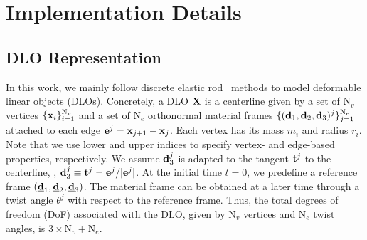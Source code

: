 \section{Implementation Details}
\subsection{DLO Representation}
\label{sec:DLORepr}

In this work, we mainly follow discrete elastic rod~\citep{bergou2008discrete,bergou2010discrete} methods to model deformable linear objects (DLOs).
Concretely, a DLO ${\mathbf{X}}$ is a centerline given by a set of $\text{N}_v$ vertices $\{{\mathbf{x}}_i\}_{i=1}^{\text{N}_v}$ and a set of $\text{N}_e$ orthonormal material frames $\{({\mathbf{d}}_1, {\mathbf{d}}_2, {\mathbf{d}}_3)^j\}_{j=1}^{\text{N}_e}$ attached to each edge ${\mathbf{e}}^j={\mathbf{x}}_{j+1}-{\mathbf{x}}_j$. Each vertex has its mass $m_i$ and radius $r_i$. Note that we use lower and upper indices to specify vertex- and edge-based properties, respectively.
We assume ${\mathbf{d}}_3^j$ is adapted to the tangent ${\mathbf{t}}^j$ to the centerline, \ie, ${\mathbf{d}}_3^j \equiv {\mathbf{t}}^j = {\mathbf{e}}^j/|{\mathbf{e}}^j|$.  At the initial time $t=0$, we predefine a reference frame $(\underline{{\mathbf{d}}}_1, \underline{{\mathbf{d}}}_2, \underline{{\mathbf{d}}}_3)$. The material frame can be obtained at a later time through a twist angle $\theta^j$ with respect to the reference frame. Thus, the total degrees of freedom (DoF) associated with the DLO, given by $\text{N}_v$ vertices and $\text{N}_e$ twist angles, is $3\times \text{N}_v+\text{N}_e$.

